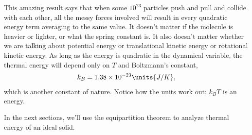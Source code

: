 
This amazing result says that when some $10^{23}$ particles push and pull
and collide with each other, all the messy forces involved will result in
every quadratic energy term averaging to the same value.   It doesn't
matter if the molecule is heavier or lighter, or what the spring
constant is.  It also doesn't matter whether we are talking about
potential energy or translational kinetic energy or rotational kinetic
energy.  As long as the energy is quadratic in the dynamical variable, 
the thermal energy will depend only on $T$ and
Boltzmann's constant,
\begin{equation}
k_B= 1.38\times 10^{-23}\units{J/K},
\end{equation}
which is another constant of nature.  Notice how the units work out:
$k_BT$ is an energy.


In the next sections, we'll use the equipartition theorem to analyze
thermal energy of an ideal solid.

